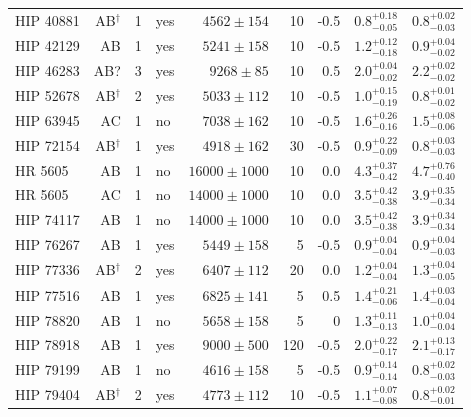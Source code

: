 {\begin{scriptsize}
\begin{longtable}{|l|rrlrrrll|}
  HIP 40881 & AB$^{\dagger}$ &     1 & yes &  $4562 \pm 154$ &      10 &    -0.5  &  $0.8^{+0.18}_{-0.05}$ &  $0.8^{+0.02}_{-0.03}$ \\
  HIP 42129 & AB &     1 & yes &  $5241 \pm 158$ &      10 &    -0.5  &  $1.2^{+0.12}_{-0.18}$ &  $0.9^{+0.04}_{-0.02}$ \\
  HIP 46283 & AB? &     3 & yes &   $9268 \pm 85$ &      10 &     0.5  &    $2.0^{+0.04}_{-0.02}$ &  $2.2^{+0.02}_{-0.02}$ \\
  HIP 52678 & AB$^{\dagger}$ &     2 & yes &  $5033 \pm 112$ &      10 &    -0.5  &  $1.0^{+0.15}_{-0.19}$ &  $0.8^{+0.01}_{-0.02}$ \\  
  HIP 63945 & AC &     1 & no &  $7038 \pm 162$ &      10 &    -0.5 &  $1.6^{+0.26}_{-0.16}$ &  $1.5^{+0.08}_{-0.06}$ \\
  HIP 72154 & AB$^{\dagger}$ &     1 & yes &  $4918 \pm 162$ &      30 &    -0.5  &  $0.9^{+0.22}_{-0.09}$ &  $0.8^{+0.03}_{-0.03}$ \\
    HR 5605 & AB &     1 & no &  $16000 \pm 1000$ &     10 &     0.0 &  $4.3^{+0.37}_{-0.42}$ &  $4.7^{+0.76}_{-0.40}$ \\
    HR 5605 & AC &     1 & no &  $14000 \pm 1000$ &     10 &     0.0 &  $3.5^{+0.42}_{-0.38}$ &  $3.9^{+0.35}_{-0.34}$ \\
  HIP 74117 & AB &     1 & no &  $14000 \pm 1000$ &     10 &     0.0 &  $3.5^{+0.42}_{-0.38}$ &  $3.9^{+0.34}_{-0.34}$ \\
  HIP 76267 & AB &     1 & yes &  $5449 \pm 158$ &       5 &    -0.5  &  $0.9^{+0.04}_{-0.04}$ &  $0.9^{+0.04}_{-0.03}$ \\
  HIP 77336 & AB$^{\dagger}$ &     2 & yes &  $6407 \pm 112$ &      20 &     0.0  &  $1.2^{+0.04}_{-0.04}$ &  $1.3^{+0.04}_{-0.05}$ \\
  HIP 77516 & AB &     1 & yes &  $6825 \pm 141$ &       5 &     0.5  &  $1.4^{+0.21}_{-0.06}$ &  $1.4^{+0.03}_{-0.04}$ \\
  HIP 78820 & AB &     1 & no &  $5658 \pm 158$ &       5 &    0 &  $1.3^{+0.11}_{-0.13}$ &  $1.0^{+0.04}_{-0.04}$ \\
  HIP 78918 & AB &     1 & yes &    $9000 \pm 500$ &    120 &    -0.5 &  $2.0^{+0.22}_{-0.17}$ &  $2.1^{+0.13}_{-0.17}$ \\
  HIP 79199 & AB &     1 & no &  $4616 \pm 158$ &       5 &    -0.5  &  $0.9^{+0.14}_{-0.14}$ &  $0.8^{+0.02}_{-0.03}$ \\
  HIP 79404 & AB$^{\dagger}$ &     2 & yes &  $4773 \pm 112$ &      10 &    -0.5  &  $1.1^{+0.07}_{-0.08}$ &  $0.8^{+0.02}_{-0.01}$ \\

\end{longtable}
\end{scriptsize}}
